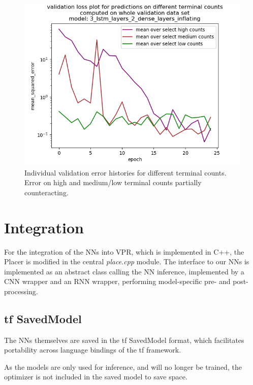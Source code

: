 \begin{figure}[H]
	\includegraphics[width=\linewidth]{plots/rnn-training-history-individual-3_lstm_layers_2_dense_layers_inflating.png}
	\caption{Individual validation error histories for different terminal counts. Error on high and medium/low terminal counts partially counteracting.}
	\label{fig:rnn-training-individual}
\end{figure}

\section{Integration}

For the integration of the \glspl{NN} into \gls{VPR}, which is implemented in C++, the Placer is modified in the central \textit{place.cpp} module. The interface to our \glspl{NN} is implemented as an abstract class calling the \gls{NN} inference, implemented by a \gls{CNN} wrapper and an \gls{RNN} wrapper, performing model-specific pre- and post-processing.

\subsection{\gls{tf} SavedModel}

The \glspl{NN} themselves are saved in the \gls{tf} SavedModel format, which facilitates portability across language bindings of the \gls{tf} framework. 
	
As the models are only used for inference, and will no longer be trained, the optimizer is not included in the saved model to save space.

